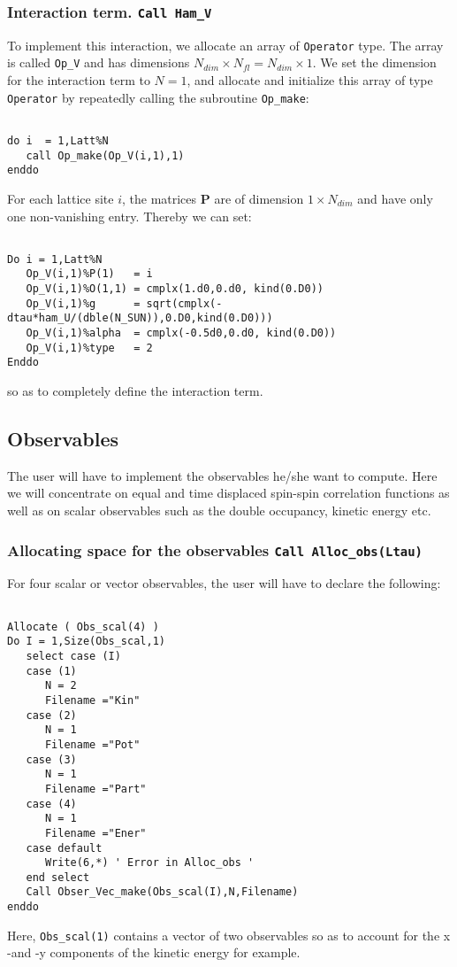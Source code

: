 \subsubsection{Interaction term. \texttt{Call Ham\_V}}
To implement this interaction, we allocate an array of \texttt{Operator} type. The array is called  \texttt{Op\_V} and has dimensions $N_{dim}\times N_{fl}=N_{dim} \times 1$. 
We set the dimension for the interaction term to  $N=1$, and  allocate and initialize this array of type  \texttt{Operator} by repeatedly calling the subroutine \texttt{Op\_make}: 

\begin{lstlisting}

do i  = 1,Latt%N
   call Op_make(Op_V(i,1),1)
enddo

\end{lstlisting}
For each lattice site $i$, the  matrices ${\bm P}$ are of dimension $1\times N_{dim} $ and have only one non-vanishing entry. Thereby we can set:

\begin{lstlisting}

Do i = 1,Latt%N
   Op_V(i,1)%P(1)   = i
   Op_V(i,1)%O(1,1) = cmplx(1.d0,0.d0, kind(0.D0))
   Op_V(i,1)%g      = sqrt(cmplx(-dtau*ham_U/(dble(N_SUN)),0.D0,kind(0.D0)))
   Op_V(i,1)%alpha  = cmplx(-0.5d0,0.d0, kind(0.D0))
   Op_V(i,1)%type   = 2
Enddo

\end{lstlisting}
so as to completely define the interaction term. 

\subsection{Observables}
The user will have to  implement the  observables  he/she  want to compute. Here we will concentrate on  equal and time displaced  spin-spin correlation functions as well as on  scalar observables such as the double occupancy, kinetic energy etc. 
\subsubsection{Allocating space for the observables \texttt{Call Alloc\_obs(Ltau) }}

 For  four scalar  or vector observables,  the user will have to  declare the following: 
\begin{lstlisting}

Allocate ( Obs_scal(4) )
Do I = 1,Size(Obs_scal,1)
   select case (I)
   case (1)
      N = 2
      Filename ="Kin"
   case (2)
      N = 1
      Filename ="Pot"
   case (3)
      N = 1
      Filename ="Part"
   case (4)
      N = 1
      Filename ="Ener"
   case default
      Write(6,*) ' Error in Alloc_obs '  
   end select
   Call Obser_Vec_make(Obs_scal(I),N,Filename)
enddo
\end{lstlisting}
Here,   \texttt{Obs\_scal(1)}   contains a vector  of two observables  so as to account for the x -and -y components of the kinetic energy for example.  

